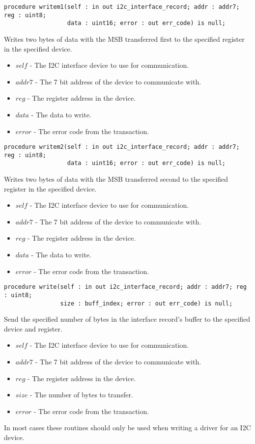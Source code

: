 \documentclass[10pt, openany]{book}
\begin{document}
\begin{lstlisting}
procedure writem1(self : in out i2c_interface_record; addr : addr7; reg : uint8;
                  data : uint16; error : out err_code) is null;
\end{lstlisting}
Writes two bytes of data with the MSB transferred first to the specified register in the specified device.
\begin{itemize}
  \item $self$ - The I2C interface device to use for communication.
  \item $addr7$ - The 7 bit address of the device to communicate with.
  \item $reg$ - The register address in the device.
  \item $data$ - The data to write.
  \item $error$ - The error code from the transaction.
\end{itemize}

\begin{lstlisting}
procedure writem2(self : in out i2c_interface_record; addr : addr7; reg : uint8;
                  data : uint16; error : out err_code) is null;
\end{lstlisting}
Writes two bytes of data with the MSB transferred second to the specified register in the specified device.
\begin{itemize}
  \item $self$ - The I2C interface device to use for communication.
  \item $addr7$ - The 7 bit address of the device to communicate with.
  \item $reg$ - The register address in the device.
  \item $data$ - The data to write.
  \item $error$ - The error code from the transaction.
\end{itemize}

\begin{lstlisting}
procedure write(self : in out i2c_interface_record; addr : addr7; reg : uint8;
                size : buff_index; error : out err_code) is null;
\end{lstlisting}
Send the specified number of bytes in the interface record's buffer to the specified device and register.
\begin{itemize}
  \item $self$ - The I2C interface device to use for communication.
  \item $addr7$ - The 7 bit address of the device to communicate with.
  \item $reg$ - The register address in the device.
  \item $size$ - The number of bytes to transfer.
  \item $error$ - The error code from the transaction.
\end{itemize}
In most cases these routines should only be used when writing a driver for an I2C device.
\end{document}
